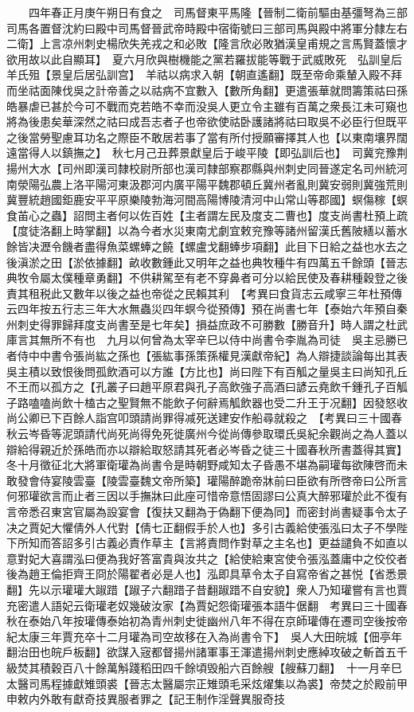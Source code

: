 　　四年春正月庚午朔日有食之　司馬督東平馬隆【晉制二衛前驅由基彊弩為三部司馬各置督沈約曰殿中司馬督晉武帝時殿中宿衛號曰三部司馬與殿中將軍分隸左右二衛】上言凉州刺史楊欣失羌戎之和必敗【隆言欣必敗猶漢皇甫規之言馬賢蓋懷才欲用故以此自顯耳】　夏六月欣與樹機能之黨若羅拔能等戰于武威敗死　弘訓皇后羊氏殂【景皇后居弘訓宫】　羊祜以病求入朝【朝直遙翻】既至帝命乘輦入殿不拜而坐祜面陳伐吳之計帝善之以祜病不宜數入【數所角翻】更遣張華就問籌策祜曰孫皓暴虐已甚於今可不戰而克若皓不幸而没吳人更立令主雖有百萬之衆長江未可窺也將為後患矣華深然之祜曰成吾志者子也帝欲使祜卧護諸將祜曰取吳不必臣行但既平之後當勞聖慮耳功名之際臣不敢居若事了當有所付授願審擇其人也【以東南壤界闊遠當得人以鎮撫之】　秋七月己丑葬景獻皇后于峻平陵【即弘訓后也】　司冀兖豫荆揚州大水【司州即漢司隸校尉所部也漢司隸部察郡縣與州刺史同晉遂定名司州統河南滎陽弘農上洛平陽河東汲郡河内廣平陽平魏郡頓丘冀州者亂則冀安弱則冀強荒則冀豐統趙國鉅鹿安平平原樂陵勃海河間高陽博陵清河中山常山等郡國】螟傷稼【螟食苖心之蟲】詔問主者何以佐百姓【主者謂左民及度支二曹也】度支尚書杜預上疏【度徒洛翻上時掌翻】以為今者水災東南尤劇宜敕兖豫等諸州留漢氏舊陂繕以蓄水餘皆决瀝令饑者盡得魚菜螺蜯之饒【螺盧戈翻蜯步項翻】此目下日給之益也水去之後滇淤之田【淤依據翻】畝收數鍾此又明年之益也典牧種牛有四萬五千餘頭【晉志典牧令屬太僕種章勇翻】不供耕駕至有老不穿鼻者可分以給民使及春耕種穀登之後責其租税此又數年以後之益也帝從之民賴其利　【考異曰食貨志云咸寧三年杜預傳云四年按五行志三年大水無蟲災四年螟今從預傳】預在尚書七年【泰始六年預自秦州刺史得罪歸拜度支尚書至是七年矣】損益庶政不可勝數【勝音升】時人謂之杜武庫言其無所不有也　九月以何曾為太宰辛巳以侍中尚書令李胤為司徒　吳主忌勝已者侍中中書令張尚紘之孫也【張紘事孫策孫權見漢獻帝紀】為人辯捷談論每出其表吳主積以致恨後問孤飲酒可以方誰【方比也】尚曰陛下有百觚之量吳主曰尚知孔丘不王而以孤方之【孔叢子曰趙平原君與孔子高飲強子高酒曰諺云堯飲千鍾孔子百觚子路嗑嗑尚飲十榼古之聖賢無不能飲子何辭焉觚飲器也受二升王于况翻】因發怒收尚公卿已下百餘人詣宫叩頭請尚罪得减死送建安作船尋就殺之　【考異曰三十國春秋云岑昏等泥頭請代尚死尚得免死徙廣州今從尚傳參取環氏吳紀余觀尚之為人蓋以辯給得親近於孫皓而亦以辯給取怒請其死者必岑昏之徒三十國春秋所書蓋得其實】　冬十月徵征北大將軍衛瓘為尚書令是時朝野咸知太子昏愚不堪為嗣瓘每欲陳啓而未敢發會侍宴陵雲臺【陵雲臺魏文帝所築】瓘陽醉跪帝牀前曰臣欲有所啓帝曰公所言何邪瓘欲言而止者三因以手撫牀曰此座可惜帝意悟固謬曰公真大醉邪瓘於此不復有言帝悉召東宮官屬為設宴會【復扶又翻為于偽翻下便為同】而密封尚書疑事令太子决之賈妃大懼倩外人代對【倩七正翻假手於人也】多引古義給使張泓曰太子不學陛下所知而答詔多引古義必責作草主【言將責問作對草之主名也】更益譴負不如直以意對妃大喜謂泓曰便為我好答富貴與汝共之【給使給東宮使令張泓蓋庸中之佼佼者後為趙王倫拒齊王冏於陽翟者必是人也】泓即具草令太子自寫帝省之甚悦【省悉景翻】先以示瓘瓘大踧踖【踧子六翻踖子昔翻踧踖不自安貌】衆人乃知瓘嘗有言也賈充密遣人語妃云衛瓘老奴幾破汝家【為賈妃怨衛瓘張本語牛倨翻　考異曰三十國春秋在泰始八年按瓘傳泰始初為青州刺史徙幽州八年不得在京師瓘傳在遷司空後按帝紀太康三年賈充卒十二月瓘為司空故移在入為尚書令下】　吳人大田皖城【佃亭年翻治田也皖戶板翻】欲謀入宼都督揚州諸軍事王渾遣揚州刺史應綽攻破之斬首五千級焚其積穀百八十餘萬斛踐稻田四千餘頃毁船六百餘艘【艘蘇刀翻】　十一月辛巳太醫司馬程據獻雉頭裘【晉志太醫屬宗正雉頭毛采炫燿集以為裘】帝焚之於殿前甲申敕内外敢有獻奇技異服者罪之【記王制作淫聲異服奇技